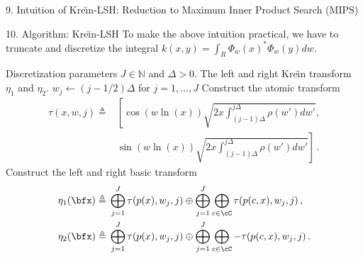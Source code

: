 \documentclass[final]{beamer}
\newcommand{\kr}{Kre\u{\i}n\xspace}
\DeclareMathOperator{\sech}{sech}
\newcommand{\eg}{\emph{e.g.}\xspace}
\newlength{\onecolwid}
\begin{document}
\begin{frame}[t]
\begin{columns}[t]
\begin{column}{\onecolwid}
\begin{block}{9. Intuition of \kr-LSH: Reduction to Maximum Inner Product Search (MIPS)}
		
	\end{block}
	\begin{block}{10. Algorithm: \kr-LSH}
	To make the above intuition 
		practical, we have
		to truncate and discretize the 
		integral $ k(x,y) = \int_R \Phi_w(x)^* \Phi_w(y) 
		dw  $.
			\begin{algorithmic}[1]
				\Require Discretization parameters $ J\in \mathbb{N} $ and $ 
				\Delta>0 $.
				\Ensure The left and right \kr transform $ \eta_1 $ and $ 
				\eta_2 $.
				\State $ w_j \gets (j-1/2)\Delta $ for $ j=1,\dots,J $
				\State Construct the atomic transform \begin{align*}
				\tau(x,w,j)\triangleq{}&
				\left[\cos(w\ln(x))\sqrt{2x\int_{(j-1)\Delta}^{j\Delta} 
					\rho(w')dw'},\right.\\
					& \left.\sin(w\ln(x))\sqrt{ 
					2x\int_{(j-1)\Delta}^{j\Delta} 
					\rho(w')dw' }\right]
				\,.
				\end{align*}
				\State Construct the left and right basic transform 
				\begin{align*}
				\eta_1(\bfx)\triangleq{} & \bigoplus_{j=1}^J 
				\tau(p(x),w_j,j)\oplus 
				\bigoplus_{j=1}^{J} \bigoplus_{c\in \cC} \tau(p(c,x),w_j,j)\,,\\
				\eta_2(\bfx)\triangleq{} & \bigoplus_{j=1}^J 
				\tau(p(x),w_j,j)\oplus 
				\bigoplus_{j=1}^{J} \bigoplus_{c\in \cC} -\tau(p(c,x),w_j,j)\,.
				\end{align*}

\end{algorithmic}
\end{block}
\end{column}
\end{columns}
\end{frame}
\end{document}
